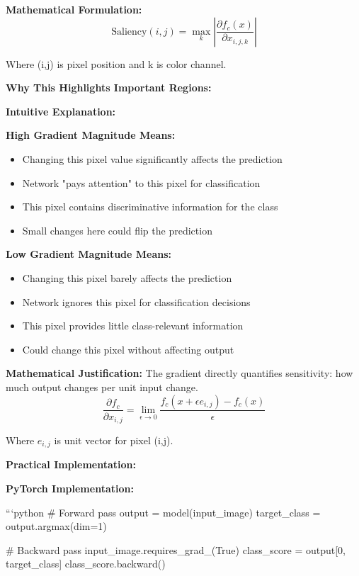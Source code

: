 \documentclass[12pt]{article}
\newcommand{\explanation}[1]{{\color{explanationcolor}#1}}
\begin{document}
\begin{enumerate}[(a)]
{{    \textbf{Mathematical Formulation:}
    \[
    \text{Saliency}(i,j) = \max_k |\frac{\partial f_c(x)}{\partial x_{i,j,k}}|
    \]
    
    Where (i,j) is pixel position and k is color channel.
    }
    
    \textbf{Why This Highlights Important Regions:}
    
    \explanation{
    \textbf{Intuitive Explanation:}
    
    \textbf{High Gradient Magnitude Means:}
    \begin{itemize}
        \item Changing this pixel value significantly affects the prediction
        \item Network "pays attention" to this pixel for classification
        \item This pixel contains discriminative information for the class
        \item Small changes here could flip the prediction
    \end{itemize}
    
    \textbf{Low Gradient Magnitude Means:}
    \begin{itemize}
        \item Changing this pixel barely affects the prediction
        \item Network ignores this pixel for classification decisions
        \item This pixel provides little class-relevant information
        \item Could change this pixel without affecting output
    \end{itemize}
    
    \textbf{Mathematical Justification:}
    The gradient directly quantifies sensitivity: how much output changes per unit input change.
    \[
    \frac{\partial f_c}{\partial x_{i,j}} = \lim_{\epsilon \to 0} \frac{f_c(x + \epsilon e_{i,j}) - f_c(x)}{\epsilon}
    \]
    
    Where $e_{i,j}$ is unit vector for pixel (i,j).
    }
    
    \textbf{Practical Implementation:}
    
    \explanation{
    \textbf{PyTorch Implementation:}
    
    ```python
    # Forward pass
    output = model(input_image)
    target_class = output.argmax(dim=1)
    
    # Backward pass
    input_image.requires_grad_(True)
    class_score = output[0, target_class]
    class_score.backward()
    
}}
\end{enumerate}
\end{document}
